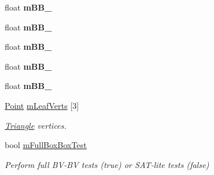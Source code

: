 \begin{DoxyCompactItemize}
\item 
float {\bfseries m\+B\+B\+\_}\hypertarget{classOpcode_1_1OBBCollider_aed7ef63e1e0ce7a00b5861e56edd3210}{}\label{classOpcode_1_1OBBCollider_aed7ef63e1e0ce7a00b5861e56edd3210}

\item 
float {\bfseries m\+B\+B\+\_}\hypertarget{classOpcode_1_1OBBCollider_a1cdec5424fe02a166882d616ca75c7ca}{}\label{classOpcode_1_1OBBCollider_a1cdec5424fe02a166882d616ca75c7ca}

\item 
float {\bfseries m\+B\+B\+\_}\hypertarget{classOpcode_1_1OBBCollider_a632699d1220d3b1fb745a579018ef11c}{}\label{classOpcode_1_1OBBCollider_a632699d1220d3b1fb745a579018ef11c}

\item 
float {\bfseries m\+B\+B\+\_}\hypertarget{classOpcode_1_1OBBCollider_a221cfc3d27cadc4c270db4ad9bb41e47}{}\label{classOpcode_1_1OBBCollider_a221cfc3d27cadc4c270db4ad9bb41e47}

\item 
float {\bfseries m\+B\+B\+\_}\hypertarget{classOpcode_1_1OBBCollider_ab7efa4449b98f7ddb3eaa5d5035e7797}{}\label{classOpcode_1_1OBBCollider_ab7efa4449b98f7ddb3eaa5d5035e7797}

\item 
\hyperlink{classOpcode_1_1Point}{Point} \hyperlink{classOpcode_1_1OBBCollider_ab9673ea42d640e01c4a615e0918e3ad3}{m\+Leaf\+Verts} \mbox{[}3\mbox{]}\hypertarget{classOpcode_1_1OBBCollider_ab9673ea42d640e01c4a615e0918e3ad3}{}\label{classOpcode_1_1OBBCollider_ab9673ea42d640e01c4a615e0918e3ad3}

\begin{DoxyCompactList}\small\item\em \hyperlink{classOpcode_1_1Triangle}{Triangle} vertices. \end{DoxyCompactList}\item 
bool \hyperlink{classOpcode_1_1OBBCollider_a9ee29c2948fd67fba4dd40dcfe7f7805}{m\+Full\+Box\+Box\+Test}\hypertarget{classOpcode_1_1OBBCollider_a9ee29c2948fd67fba4dd40dcfe7f7805}{}\label{classOpcode_1_1OBBCollider_a9ee29c2948fd67fba4dd40dcfe7f7805}

\begin{DoxyCompactList}\small\item\em Perform full B\+V-\/\+BV tests (true) or S\+A\+T-\/lite tests (false) \end{DoxyCompactList}\end{DoxyCompactItemize}



